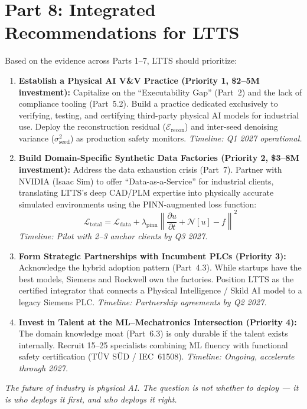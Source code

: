 \documentclass[11pt,a4paper]{article}
\begin{document}
\section{Part 8: Integrated Recommendations for LTTS}

Based on the evidence across Parts 1--7, LTTS should prioritize:
\begin{enumerate}
    \item \textbf{Establish a Physical AI V\&V Practice (Priority 1, \$2--5M investment):} Capitalize on the ``Executability Gap'' (Part~2) and the lack of compliance tooling (Part~5.2). Build a practice dedicated exclusively to verifying, testing, and certifying third-party physical AI models for industrial use. Deploy the reconstruction residual ($\mathcal{E}_{\text{recon}}$) and inter-seed denoising variance ($\sigma^2_{\text{seed}}$) as production safety monitors. \textit{Timeline: Q1 2027 operational.}

    \item \textbf{Build Domain-Specific Synthetic Data Factories (Priority 2, \$3--8M investment):} Address the data exhaustion crisis (Part~7). Partner with NVIDIA (Isaac Sim) to offer ``Data-as-a-Service'' for industrial clients, translating LTTS's deep CAD/PLM expertise into physically accurate simulated environments using the PINN-augmented loss function:
    \[
    \mathcal{L}_{\text{total}} = \mathcal{L}_{\text{data}} + \lambda_{\text{pinn}}\left\|\frac{\partial u}{\partial t} + \mathcal{N}[u] - f\right\|^2
    \]
    \textit{Timeline: Pilot with 2--3 anchor clients by Q3 2027.}

    \item \textbf{Form Strategic Partnerships with Incumbent PLCs (Priority 3):} Acknowledge the hybrid adoption pattern (Part~4.3). While startups have the best models, Siemens and Rockwell own the factories. Position LTTS as the certified integrator that connects a Physical Intelligence / Skild AI model to a legacy Siemens PLC. \textit{Timeline: Partnership agreements by Q2 2027.}

    \item \textbf{Invest in Talent at the ML--Mechatronics Intersection (Priority 4):} The domain knowledge moat (Part~6.3) is only durable if the talent exists internally. Recruit 15--25 specialists combining ML fluency with functional safety certification (TÜV SÜD / IEC~61508). \textit{Timeline: Ongoing, accelerate through 2027.}
\end{enumerate}

\vspace{0.3cm}
\begin{center}
\small\color{textgray}\textit{The future of industry is physical AI. The question is not whether to deploy --- it is who deploys it first, and who deploys it right.}
\end{center}
\end{document}
